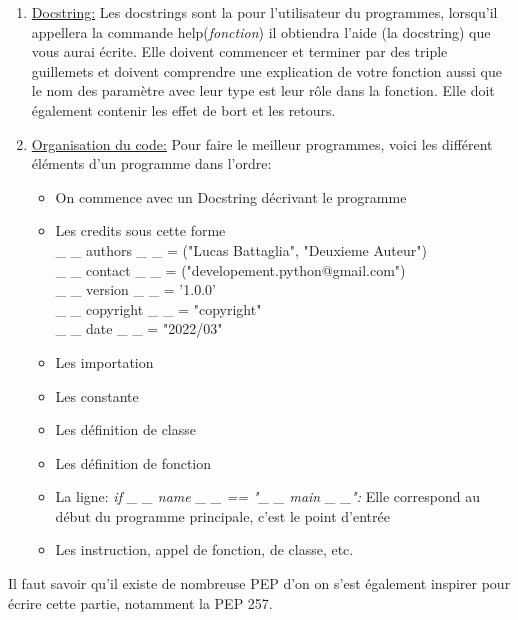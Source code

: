 \begin{enumerate}
	\label{PEP8:point8} \item \underline{Docstring:} Les docstrings sont la pour l'utilisateur du programmes, lorsqu'il appellera la commande help(\textit{fonction}) il obtiendra l'aide (la docstring) que vous aurai écrite. Elle doivent commencer et terminer par des triple guillemets et doivent comprendre une explication de votre fonction aussi que le nom des paramètre avec leur type est leur rôle dans la fonction. Elle doit également contenir les effet de bort et les retours.
	
	\label{PEP8:point9} \item \underline{Organisation du code:} Pour faire le meilleur programmes, voici les différent éléments d'un programme dans l'ordre:
	\begin{itemize}
	[label=\textbullet]
		\item On commence avec un Docstring décrivant le programme
		\item Les credits sous cette forme\\
			\_ \_ authors \_ \_ = ("Lucas Battaglia", "Deuxieme Auteur")\\
			\_ \_ contact \_ \_ = ("developement.python@gmail.com")\\
			\_ \_ version \_ \_ = '1.0.0'\\
			\_ \_ copyright \_ \_ = "copyright"\\
			\_ \_ date \_ \_ = "2022/03"\\
		\item Les importation
		\item Les constante
		\item Les définition de classe
		\item Les définition de fonction
		\item La ligne: \textit{if \_ \_ name \_ \_ == "\_ \_ main \_ \_":} Elle correspond au début du programme principale, c'est le point d'entrée
		\item Les instruction, appel de fonction, de classe, etc.
	\end{itemize}
\end{enumerate}

Il faut savoir qu'il existe de nombreuse PEP d'on on s'est également inspirer pour écrire cette partie, notamment la PEP 257.